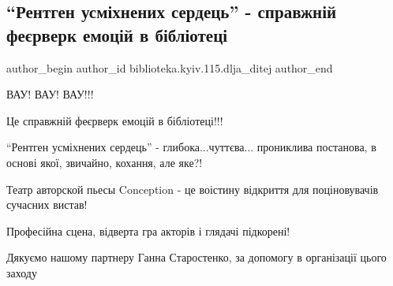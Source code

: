  
 
 
 
 

\subsection{\enquote{Рентген усміхнених сердець} - справжній феєрверк емоцій в бібліотеці}
\label{sec:16_03_2023.fb.biblioteka.kyiv.115.dlja_ditej.1.rentgen_usmihnenyh_serdecj_fejerverk_emocij_v_biblioteci}

\ifcmt
 author_begin
   author_id biblioteka.kyiv.115.dlja_ditej
 author_end
\fi

ВАУ! ВАУ! ВАУ!!!

Це справжній феєрверк емоцій в бібліотеці!!!

\enquote{Рентген усміхнених сердець} - глибока...чуттєва... прониклива постанова, в основі якої, звичайно, кохання, але яке?! 

Театр авторской пьесы Conception - це воістину відкриття для поціновувачів сучасних вистав!

Професійна сцена, відверта гра акторів і глядачі підкорені! 

Дякуємо нашому партнеру Ганна Старостенко, за допомогу в організації цього заходу
